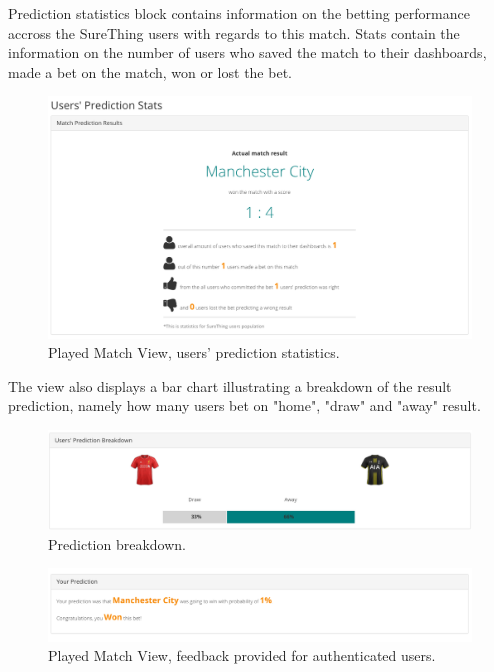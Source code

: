 Prediction statistics block contains information on the betting performance accross the SureThing users with regards to this match. Stats contain the information on the number of users who saved the match to their dashboards, made a bet on the match, won or lost the bet. 

\begin{figure}[H]
	\begin{center}
		\includegraphics[width=.90\linewidth,natwidth=610,natheight=642]{impl/images/predictionStats}
		\caption{Played Match View, users' prediction statistics.} \label{fig:predictionStats}
	\end{center}
\end{figure}

The view also displays a bar chart illustrating a breakdown of the result prediction, namely how many users bet on "home", "draw" and "away" result.

\begin{figure}[H]
	\begin{center}
		\includegraphics[width=.90\linewidth,natwidth=610,natheight=642]{impl/images/predictionBreakdown}
		\caption{Prediction breakdown.} \label{fig:predictionBreakdown}
	\end{center}
\end{figure}


\begin{figure}[H]
	\begin{center}
		\includegraphics[width=.90\linewidth,natwidth=610,natheight=642]{impl/images/feedback}
		\caption{Played Match View, feedback provided for authenticated users.} \label{fig:feedback}
	\end{center}
\end{figure}


